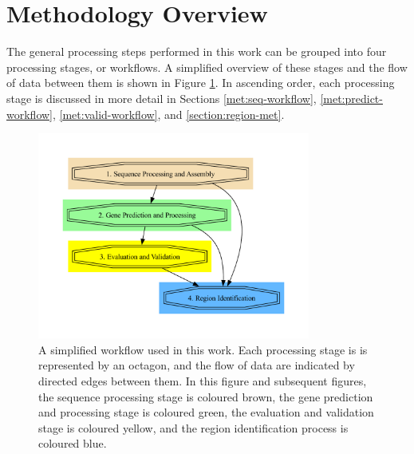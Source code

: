 \section{Methodology Overview}

The general processing steps performed in this work can be grouped
into four processing stages, or workflows. A simplified overview of
these stages and the flow of data between them is shown in Figure
\ref{fig:simple-work}. In ascending order, each processing stage is
discussed in more detail in Sections \ref{met:seq-workflow},
\ref{met:predict-workflow}, \ref{met:valid-workflow}, and
\ref{section:region-met}.

\begin{figure}
  \centering
  \includegraphics[width=0.8\textwidth]{figures/workflow-simple.pdf}
  \caption{A simplified workflow used in this work. Each processing
    stage is is represented by an octagon, and the flow of data are
    indicated by directed edges between them. In this figure and
    subsequent figures, the sequence processing stage is coloured
    brown, the gene prediction and processing stage is coloured green,
    the evaluation and validation stage is coloured yellow, and the
    region identification process is coloured blue.}
  \label{fig:simple-work}
\end{figure}



